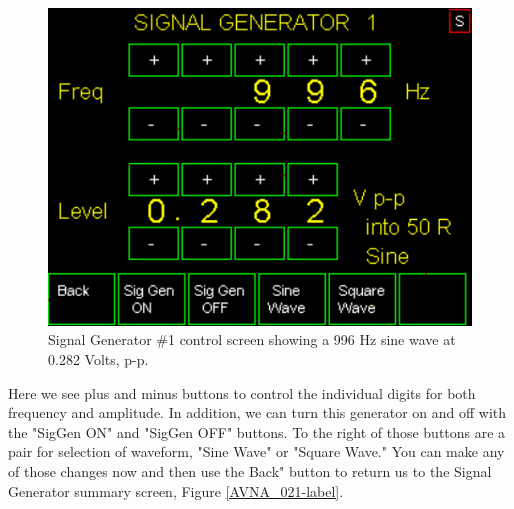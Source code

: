 \begin{figure}[H]
\begin{center}
\includegraphics[scale=0.75]{./images/AVNA_022.pdf}
\caption{Signal Generator \#1 control screen  showing a 996 Hz sine wave at 0.282 Volts, p-p.  }
\label{AVNA_022-label}
\end{center}
\end{figure}
%
Here we see plus and minus buttons to control the individual digits for both frequency and amplitude.  In addition, we can turn this generator on and off with the "SigGen ON" and "SigGen OFF" buttons.  To the right of those buttons are a pair for selection of waveform, "Sine Wave" or "Square Wave."  You can make any of those changes now and then use the Back" button to return us to the Signal Generator summary screen, Figure \ref{AVNA_021-label}.

